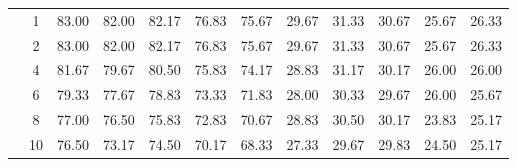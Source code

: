 \begin{table}[H]
\begin{tabular}{|c|c|c c c c c|c c c c c|}
\multicolumn{1}{|c|}{ \multirow{6}{*}{\rotatebox[origin=c]{90}{\textbf{K-vizinhos}}} }
&1	&83.00&	82.00&	82.17&	76.83&	75.67&	29.67&	31.33&	30.67&	25.67&	26.33\\\cline{2-12}
&2	&83.00&	82.00&	82.17&	76.83&	75.67&	29.67&	31.33&	30.67&	25.67&	26.33\\\cline{2-12}
&4	&81.67&	79.67&	80.50&	75.83&	74.17&	28.83&	31.17&	30.17&	26.00&	26.00\\\cline{2-12}
&6	&79.33&	77.67&	78.83&	73.33&	71.83&	28.00&	30.33&	29.67&	26.00&	25.67\\\cline{2-12}
&8	&77.00&	76.50&	75.83&	72.83&	70.67&	28.83&	30.50&	30.17&	23.83&	25.17\\\cline{2-12}
&10	&76.50&	73.17&	74.50&	70.17&	68.33&	27.33&	29.67&	29.83&	24.50&	25.17%


\\\midrule





	\end{tabular}
\end{table}


